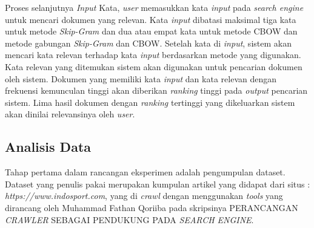 \documentclass[12pt]{report}
\begin{document}
Proses selanjutnya \textit{Input} Kata, \textit{user} memasukkan kata \textit{input} pada \textit{search engine} untuk mencari dokumen yang relevan. Kata \textit{input} dibatasi maksimal tiga kata untuk metode \textit{Skip-Gram} dan dua atau empat kata untuk metode CBOW dan metode gabungan \textit{Skip-Gram} dan CBOW. Setelah kata di \textit{input}, sistem akan mencari kata relevan terhadap kata \textit{input} berdasarkan metode yang digunakan. Kata relevan yang ditemukan sistem akan digunakan untuk pencarian dokumen oleh sistem. Dokumen yang memiliki kata \textit{input} dan kata relevan dengan frekuensi kemunculan tinggi akan diberikan \textit{ranking} tinggi pada \textit{output} pencarian sistem. Lima hasil dokumen dengan \textit{ranking} tertinggi yang dikeluarkan sistem akan dinilai relevansinya oleh \textit{user}.

\subsection{Analisis Data}
Tahap pertama dalam rancangan eksperimen adalah pengumpulan dataset. Dataset yang penulis pakai merupakan kumpulan artikel yang didapat dari situs : \textit{https://www.indosport.com}, yang di \textit{crawl} dengan menggunakan \textit{tools} yang dirancang oleh Muhammad Fathan Qoriiba pada skripsinya PERANCANGAN \textit{CRAWLER} SEBAGAI PENDUKUNG PADA \textit{SEARCH ENGINE}.
\end{document}
